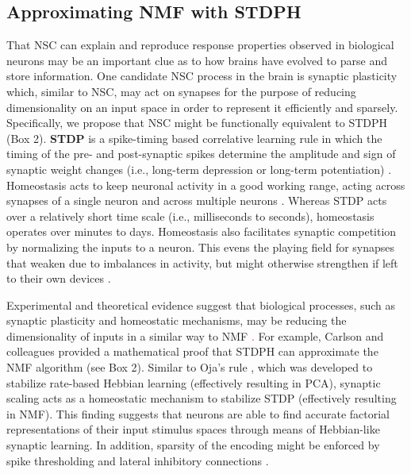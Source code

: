 \subsection{Approximating NMF with STDPH}

That \ac{NSC} can explain and reproduce response properties observed in biological neurons may be an important clue as to how brains have evolved to parse and store information. One candidate \ac{NSC} process in the brain is synaptic plasticity
which, similar to \ac{NSC},
may act on synapses for the purpose of reducing dimensionality on an input space in order to represent it efficiently and sparsely.
Specifically, we propose that \ac{NSC} might be functionally equivalent to \ac{STDPH}
(Box 2).
\textbf{\Ac{STDP}} is a spike-timing based correlative learning rule in which the
timing of the pre- and post-synaptic spikes determine the amplitude and sign
of synaptic weight changes 
(i.e., long-term depression or long-term potentiation)
\citep{BiPoo1998,SongAbbott2000}.
Homeostasis acts to keep neuronal activity in a good working range,
acting across synapses of a single neuron and across multiple neurons
\citep{turrigiano1998}.
Whereas \ac{STDP} acts over a relatively short time scale (i.e., milliseconds to seconds),
homeostasis operates over minutes to days.
Homeostasis also facilitates synaptic competition by normalizing the inputs to a neuron. 
This evens the playing field for synapses that weaken due to imbalances in activity, 
but might otherwise strengthen if left to their own devices \citep{chistiakova2015}.

Experimental and theoretical evidence suggest that biological processes, such as synaptic plasticity and homeostatic mechanisms, may be reducing the dimensionality of inputs in a similar way to NMF
\textcolor{red}{\cite{Perrinet2010,Clopath2010,IzhikevichDesai2003}.}
For example, Carlson and colleagues \citep{Carlson2013} provided a mathematical proof
that \ac{STDPH} can approximate the \ac{NMF} algorithm (see Box 2).
Similar to Oja's rule \citep{Oja1982}, which was developed to stabilize 
rate-based Hebbian learning
(effectively resulting in \ac{PCA}),
synaptic scaling acts as a homeostatic mechanism to stabilize \ac{STDP}
(effectively resulting in \ac{NMF}).
This finding suggests that neurons are able to find accurate factorial
representations of their input stimulus spaces through means of Hebbian-like
synaptic learning. In addition, sparsity of the encoding might be enforced by spike thresholding \citep{Rozell2008}
and lateral inhibitory connections \citep{Coultrip1992}.

